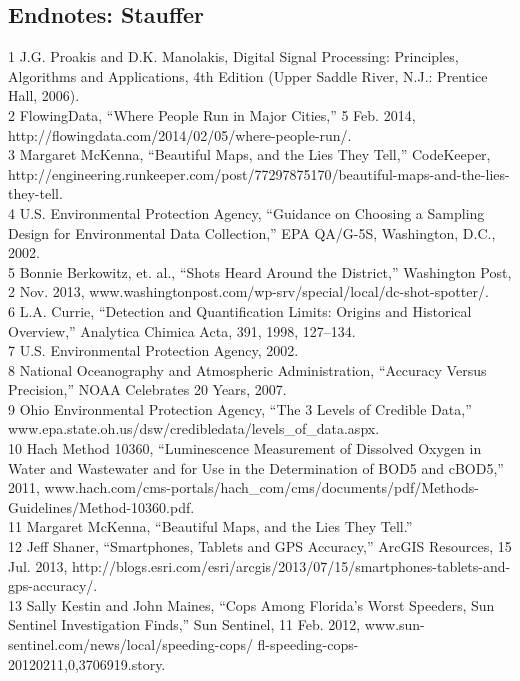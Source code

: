 \begin{itemize}
\begin{itemized}
\begin{itemize}
\section{Endnotes: Stauffer}
1 J.G. Proakis and D.K. Manolakis, Digital Signal Processing: Principles, Algorithms and Applications,
4th Edition (Upper Saddle River, N.J.: Prentice Hall, 2006).\\
2 FlowingData, ``Where People Run in Major Cities,'' 5 Feb. 2014,
http://flowingdata.com/2014/02/05/where-people-run/.\\
3 Margaret McKenna, ``Beautiful Maps, and the Lies They Tell,'' CodeKeeper,
http://engineering.runkeeper.com/post/77297875170/beautiful-maps-and-the-lies-they-tell.\\
4 U.S. Environmental Protection Agency, ``Guidance on Choosing a Sampling Design for
Environmental Data Collection,'' EPA QA/G-5S, Washington, D.C., 2002.\\
5 Bonnie Berkowitz, et. al., ``Shots Heard Around the District,'' Washington Post, 2 Nov. 2013,
www.washingtonpost.com/wp-srv/special/local/dc-shot-spotter/.\\
6 L.A. Currie, ``Detection and Quantification Limits: Origins and Historical Overview,''
Analytica Chimica Acta, 391, 1998, 127–134.\\
7 U.S. Environmental Protection Agency, 2002.\\
8 National Oceanography and Atmospheric Administration, ``Accuracy Versus Precision,''
NOAA Celebrates 20 Years, 2007.\\
9 Ohio Environmental Protection Agency, ``The 3 Levels of Credible Data,''
www.epa.state.oh.us/dsw/credibledata/levels_of_data.aspx.\\
10 Hach Method 10360, ``Luminescence Measurement of Dissolved Oxygen in Water and Wastewater
and for Use in the Determination of BOD5 and cBOD5,'' 2011, www.hach.com/cms-portals/hach_com/cms/documents/pdf/Methods-Guidelines/Method-10360.pdf.\\
11 Margaret McKenna, ``Beautiful Maps, and the Lies They Tell.''\\
12 Jeff Shaner, ``Smartphones, Tablets and GPS Accuracy,'' ArcGIS Resources, 15 Jul. 2013,
http://blogs.esri.com/esri/arcgis/2013/07/15/smartphones-tablets-and-gps-accuracy/.\\
13 Sally Kestin and John Maines, ``Cops Among Florida's Worst Speeders, Sun Sentinel Investigation
Finds,'' Sun Sentinel, 11 Feb. 2012, www.sun-sentinel.com/news/local/speeding-cops/
fl-speeding-cops-20120211,0,3706919.story.\\

\end{itemize}
\end{itemized}
\end{itemize}

